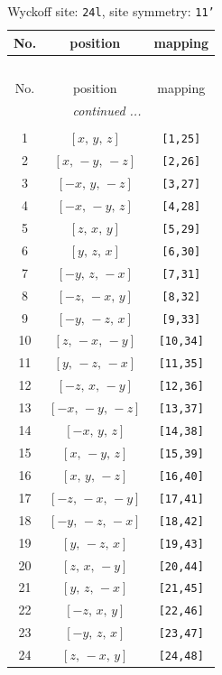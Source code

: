 \documentclass[fleqn,8pt]{jsarticle}
\begin{document}
\begin{longtable}{ccc}
\caption{Wyckoff site: {\tt 24l}, site symmetry: {\tt 11'}}
 \\
 \hline \hline
No. & position & mapping \\ \hline \endfirsthead

\multicolumn{2}{l}{\tablename\ \thetable{}} \\
 \hline \hline
No. & position & mapping \\ \hline \endhead

 \hline \hline
\multicolumn{2}{r}{\footnotesize\it continued ...} \\ \endfoot

 \hline \hline
\multicolumn{2}{r}{} \\ \endlastfoot

1 & $\left[ x,\, y,\, z \right]$ & {\tt [1,25]} \\ \hline
2 & $\left[ x,\, - y,\, - z \right]$ & {\tt [2,26]} \\ \hline
3 & $\left[ - x,\, y,\, - z \right]$ & {\tt [3,27]} \\ \hline
4 & $\left[ - x,\, - y,\, z \right]$ & {\tt [4,28]} \\ \hline
5 & $\left[ z,\, x,\, y \right]$ & {\tt [5,29]} \\ \hline
6 & $\left[ y,\, z,\, x \right]$ & {\tt [6,30]} \\ \hline
7 & $\left[ - y,\, z,\, - x \right]$ & {\tt [7,31]} \\ \hline
8 & $\left[ - z,\, - x,\, y \right]$ & {\tt [8,32]} \\ \hline
9 & $\left[ - y,\, - z,\, x \right]$ & {\tt [9,33]} \\ \hline
10 & $\left[ z,\, - x,\, - y \right]$ & {\tt [10,34]} \\ \hline
11 & $\left[ y,\, - z,\, - x \right]$ & {\tt [11,35]} \\ \hline
12 & $\left[ - z,\, x,\, - y \right]$ & {\tt [12,36]} \\ \hline
13 & $\left[ - x,\, - y,\, - z \right]$ & {\tt [13,37]} \\ \hline
14 & $\left[ - x,\, y,\, z \right]$ & {\tt [14,38]} \\ \hline
15 & $\left[ x,\, - y,\, z \right]$ & {\tt [15,39]} \\ \hline
16 & $\left[ x,\, y,\, - z \right]$ & {\tt [16,40]} \\ \hline
17 & $\left[ - z,\, - x,\, - y \right]$ & {\tt [17,41]} \\ \hline
18 & $\left[ - y,\, - z,\, - x \right]$ & {\tt [18,42]} \\ \hline
19 & $\left[ y,\, - z,\, x \right]$ & {\tt [19,43]} \\ \hline
20 & $\left[ z,\, x,\, - y \right]$ & {\tt [20,44]} \\ \hline
21 & $\left[ y,\, z,\, - x \right]$ & {\tt [21,45]} \\ \hline
22 & $\left[ - z,\, x,\, y \right]$ & {\tt [22,46]} \\ \hline
23 & $\left[ - y,\, z,\, x \right]$ & {\tt [23,47]} \\ \hline
24 & $\left[ z,\, - x,\, y \right]$ & {\tt [24,48]} \\
\end{longtable}
\end{document}
